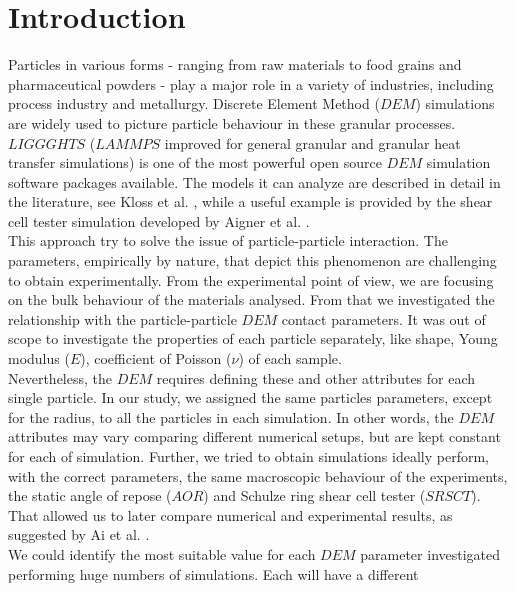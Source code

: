 \section{Introduction}
\label{sec:introduction}

Particles in various forms - ranging from raw materials to food grains and pharmaceutical powders - 
play a major role in a variety of industries, including process industry and metallurgy. 
Discrete Element Method ($DEM$) simulations are widely used to picture particle
behaviour in these granular processes.\\
$LIGGGHTS$ ($LAMMPS$ improved for general granular and granular heat transfer
simulations) is one of the most powerful open source $DEM$ simulation software packages available. 
The models it can analyze are described in detail in the literature, see Kloss
et al. \cite{RefWorks:136}, while a useful example is provided by the shear cell tester 
simulation developed by Aigner et al. \cite{RefWorks:139}.\\
This approach try to solve the issue of particle-particle interaction. The
parameters, empirically by nature, that depict this phenomenon are challenging
to obtain experimentally.
From the experimental point of view, we are focusing
on the bulk behaviour of the materials analysed.
From that we investigated the relationship with the particle-particle $DEM$
contact parameters.
It was out of scope to investigate the properties of each
particle separately, like shape, Young modulus ($E$), coefficient of Poisson ($\nu$) of each sample.\\
Nevertheless, the $DEM$ requires defining these and other attributes for each
single particle.
In our study, we assigned the same particles parameters, except for the radius, to all the 
particles in each simulation. 
In other words, the $DEM$ attributes may vary comparing different 
numerical setups, but are kept constant for each of simulation. 
Further, we tried to obtain simulations ideally perform, with the correct parameters, 
the same macroscopic behaviour of the experiments, the static angle of repose
($AOR$) and Schulze ring shear cell tester ($SRSCT$). That allowed us to later
compare numerical and experimental results, as suggested by Ai et al.
\cite{RefWorks:131}.\\
We could identify the most suitable value for each $DEM$ parameter 
investigated performing huge numbers of simulations. Each will have a different
